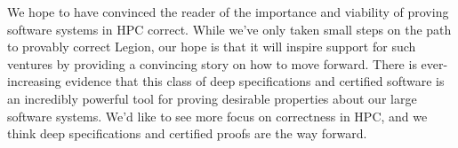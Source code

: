 \documentclass[sigplan]{acmart}
\begin{document}
We hope to have convinced the reader of the importance and viability of proving
software systems in HPC correct. While we've only taken small steps on the path
to provably correct Legion, our hope is that it will inspire support for such 
ventures by providing a convincing story on how to move forward. There is ever-
increasing evidence that this class of deep specifications and certified software
is an incredibly powerful tool for proving desirable properties about our large 
software systems. We'd like to see more focus on correctness in HPC, and we think
deep specifications and certified proofs are the way forward.

 
 
\end{document}
